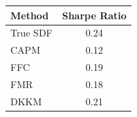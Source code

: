 \begin{tabular}{l c}
\toprule
Method & Sharpe Ratio \\
\midrule
True SDF & 0.24 \\
\midrule
CAPM & 0.12 \\
FFC & 0.19 \\
FMR & 0.18 \\
DKKM & 0.21 \\
\bottomrule
\end{tabular}